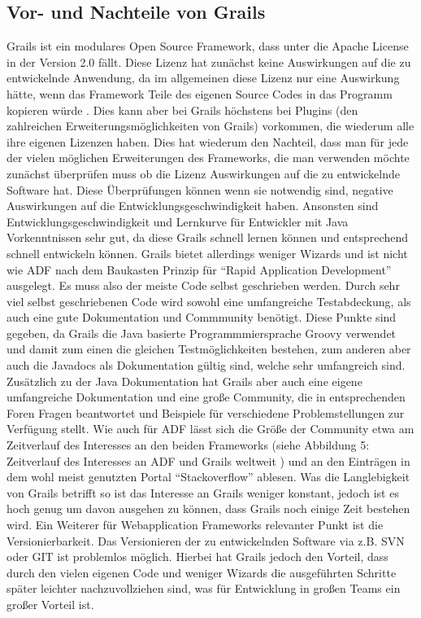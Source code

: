 \subsection{Vor- und Nachteile von Grails}
Grails ist ein modulares Open Source Framework, dass unter die Apache License in der Version 2.0 fällt. Diese Lizenz hat zunächst keine Auswirkungen auf die zu entwickelnde Anwendung, da im allgemeinen diese Lizenz nur eine Auswirkung hätte, wenn das Framework Teile des eigenen Source Codes in das Programm kopieren würde \autocite{AL2015}. Dies kann aber bei Grails höchstens bei Plugins (den zahlreichen Erweiterungsmöglichkeiten von Grails) vorkommen, die wiederum alle ihre eigenen Lizenzen haben. Dies hat wiederum den Nachteil, dass man für jede der vielen möglichen Erweiterungen des Frameworks, die man verwenden möchte zunächst überprüfen muss ob die Lizenz Auswirkungen auf die zu entwickelnde Software hat. Diese Überprüfungen können wenn sie notwendig sind, negative Auswirkungen auf die Entwicklungsgeschwindigkeit haben. Ansonsten sind Entwicklungsgeschwindigkeit und Lernkurve für Entwickler mit Java Vorkenntnissen sehr gut, da diese Grails schnell lernen können und entsprechend schnell entwickeln können. Grails bietet allerdings weniger Wizards und ist nicht wie ADF nach dem Baukasten Prinzip für "`Rapid Application Development"' ausgelegt. Es muss also der meiste Code selbst geschrieben werden. Durch sehr viel selbst geschriebenen Code wird sowohl eine umfangreiche Testabdeckung, als auch eine gute Dokumentation und Commmunity benötigt. Diese Punkte sind gegeben, da Grails die Java basierte Programmmiersprache Groovy verwendet und damit zum einen die gleichen Testmöglichkeiten bestehen, zum anderen aber auch die Javadocs als Dokumentation gültig sind, welche sehr umfangreich sind. Zusätzlich zu der Java Dokumentation hat Grails aber auch eine eigene umfangreiche Dokumentation und eine große Community, die in entsprechenden Foren Fragen beantwortet und Beispiele für verschiedene Problemstellungen zur Verfügung stellt. Wie auch für ADF lässt sich die Größe der Community etwa am Zeitverlauf des Interesses an den beiden Frameworks (siehe Abbildung 5: Zeitverlauf des Interesses an ADF und Grails weltweit
) und an den Einträgen in dem wohl meist genutzten Portal "`Stackoverflow"'\autocite{SOFG2015} ablesen. Was die Langlebigkeit von Grails betrifft so ist das Interesse an Grails weniger konstant, jedoch ist es hoch genug um davon ausgehen zu können, dass Grails noch einige Zeit bestehen wird. Ein Weiterer für Webapplication Frameworks relevanter Punkt ist die Versionierbarkeit. Das Versionieren der zu entwickelnden Software via z.B. SVN oder GIT ist problemlos möglich. Hierbei hat Grails jedoch den Vorteil, dass durch den vielen eigenen Code und weniger Wizards die ausgeführten Schritte später leichter nachzuvollziehen sind, was für Entwicklung in großen Teams ein großer Vorteil ist.